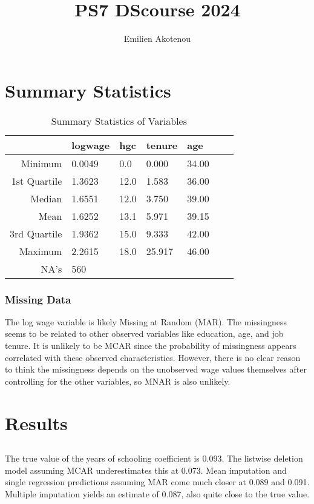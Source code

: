 \documentclass{article}
\title{PS7 DScourse 2024}
\author{Emilien Akotenou}
\begin{document}
\maketitle
\section{Summary Statistics}
\begin{table}[ht]
\centering
\caption{Summary Statistics of Variables}
\begin{tabular}{rllllll}
  \hline
 & logwage & hgc & tenure & age \\ 
  \hline
Minimum & 0.0049 & 0.0 & 0.000 & 34.00 \\ 
  1st Quartile & 1.3623 & 12.0 & 1.583 & 36.00 \\ 
  Median & 1.6551 & 12.0 & 3.750 & 39.00 \\ 
  Mean & 1.6252 & 13.1 & 5.971 & 39.15 \\ 
  3rd Quartile & 1.9362 & 15.0 & 9.333 & 42.00 \\ 
  Maximum & 2.2615 & 18.0 & 25.917 & 46.00 \\ 
  NA's & 560 &  &  &  \\ 
   \hline
\end{tabular}
\end{table}

\subsubsection{Missing Data}
The log wage variable is likely Missing at Random (MAR). The missingness seems to be related to other observed variables like education, age, and job tenure. It is unlikely to be MCAR since the probability of missingness appears correlated with these observed characteristics. However, there is no clear reason to think the missingness depends on the unobserved wage values themselves after controlling for the other variables, so MNAR is also unlikely.

\section{Results}
\subsection{}
The true value of the years of schooling coefficient is 0.093. The listwise deletion model assuming MCAR underestimates this at 0.073. Mean imputation and single regression predictions assuming MAR come much closer at 0.089 and 0.091. Multiple imputation yields an estimate of 0.087, also quite close to the true value.
\end{document}
